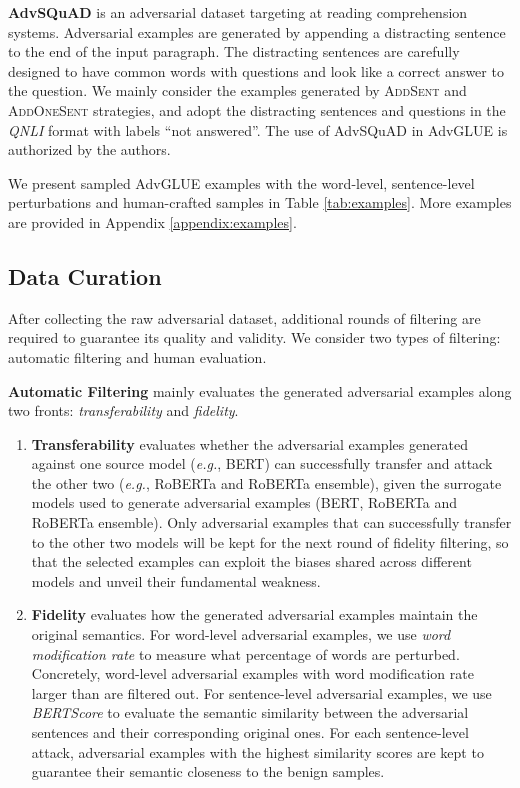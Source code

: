 \documentclass{article}
\newcommand{\method}{AdvGLUE\xspace}
\begin{document}
\textbf{AdvSQuAD} \citep{advsquad} is an adversarial dataset targeting at reading comprehension systems. Adversarial examples are generated by appending a distracting sentence to the end of the input paragraph. The distracting sentences are carefully designed to have common words with questions and look like a correct answer to the question.
We mainly consider the examples generated by \textsc{AddSent} and \textsc{AddOneSent} strategies, and adopt the distracting sentences and questions in the \textit{QNLI} format with labels ``not answered''.
The use of AdvSQuAD in \method is authorized by the authors.

We present sampled \method examples with the word-level, sentence-level perturbations and human-crafted samples in Table \ref{tab:examples}. More examples are provided in  Appendix \ref{appendix:examples}.

\subsection{Data Curation}
After collecting the raw adversarial dataset, additional rounds of filtering are required to guarantee its quality and validity. We consider two types of filtering: automatic filtering and human evaluation. 

\textbf{Automatic Filtering} mainly evaluates the generated adversarial examples along two fronts: \textit{transferability} and \textit{fidelity}.
\begin{enumerate}[leftmargin=*]
\item \textbf{Transferability} evaluates whether the adversarial examples generated against one source model (\emph{e.g.}, BERT) can successfully transfer and attack the other two (\emph{e.g.}, RoBERTa and RoBERTa ensemble), given the surrogate models used to generate adversarial examples (BERT, RoBERTa and RoBERTa ensemble).
Only  adversarial examples that can successfully transfer to the other two models will be kept for the next round of fidelity filtering, so that the selected examples can exploit the biases shared across different models and unveil their fundamental  weakness.
\item \textbf{Fidelity} evaluates how the generated adversarial examples maintain the original semantics. For word-level adversarial examples, we use \textit{word modification rate} to measure what percentage of words are perturbed. Concretely, word-level adversarial examples with word modification rate larger than  are filtered out. 
For sentence-level adversarial examples, we use \textit{BERTScore} \citep{bertscore} to evaluate the semantic similarity between the adversarial sentences and their corresponding original ones. For each sentence-level attack, adversarial examples with the highest similarity scores are kept to guarantee their semantic closeness to the benign samples.
\end{enumerate}
\end{document}
